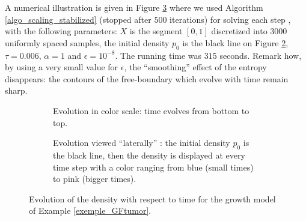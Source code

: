%
A numerical illustration is given in Figure \ref{fig_WFGF} where we used Algorithm \ref{algo_scaling_stabilized} (stopped after $500$ iterations) for solving each step , with the following parameters: $X$ is the segment $[0,1]$ discretized into $3000$ uniformly spaced samples, the initial density $p_0$ is the black line on Figure \ref{fig_WFGFprofile}, $\tau= 0.006$, $\alpha=1$ and $\epsilon = 10^{-8}$. The running time was $315$ seconds. Remark how, by using a very small value for $\epsilon$, the ``smoothing'' effect of the entropy disappears: the contours of the free-boundary which evolve with time remain sharp.

\begin{figure}
 \centering
\begin{subfigure}{1.\linewidth}
\centering
\caption{Evolution in color scale: time evolves from bottom to top.}\label{fig_WFGFtop}
\end{subfigure}
 \begin{subfigure}{.8\linewidth}
\centering
\caption{Evolution viewed ``laterally'' : the initial density $p_0$ is the black line, then the density is displayed at every time step with a color ranging from blue (small times) to pink (bigger times).}\label{fig_WFGFprofile}
\end{subfigure}
\caption{Evolution of the density with respect to time for the growth model of Example \ref{exemple_GFtumor}.}
\label{fig_WFGF}
\end{figure}


%
